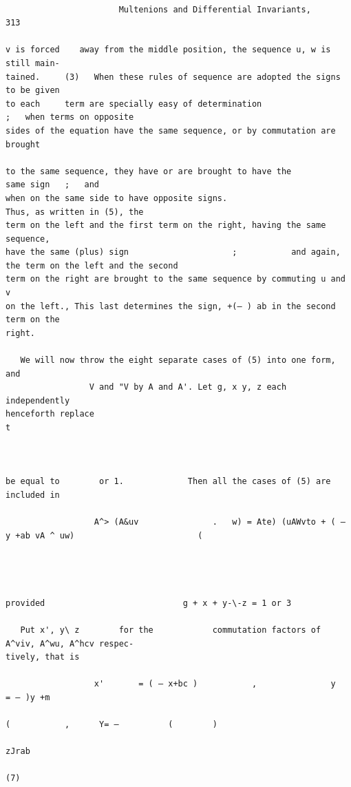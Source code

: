 \documentclass[10pt]{article}
\begin{document}
\begin{verbatim}

                       Multenions and Differential Invariants,                                                                           313

v is forced    away from the middle position, the sequence u, w is still main-
tained.     (3)   When these rules of sequence are adopted the signs to be given
to each     term are specially easy of determination                                         ;   when terms on opposite
sides of the equation have the same sequence, or by commutation are brought

to the same sequence, they have or are brought to have the                                                               same sign   ;   and
when on the same side to have opposite signs.                                              Thus, as written in (5), the
term on the left and the first term on the right, having the same sequence,
have the same (plus) sign                     ;           and again, the term on the left and the second
term on the right are brought to the same sequence by commuting u and v
on the left., This last determines the sign, +(— ) ab in the second term on the
right.

   We will now throw the eight separate cases of (5) into one form, and
                 V and "V by A and A'. Let g, x y, z each independently
henceforth replace                                                                               t



be equal to        or 1.             Then all the cases of (5) are included in

                  A^> (A&uv               .   w) = Ate) (uAWvto + ( — y +ab vA ^ uw)                         (




provided                            g + x + y-\-z = 1 or 3

   Put x', y\ z        for the            commutation factors of A^viv, A^wu, A^hcv respec-
tively, that is

                  x'       = ( — x+bc )           ,               y   = — )y +m
                                                                        (           ,      Y= —          (        )
                                                                                                                      zJrab
                                                                                                                                          (7)



\end{verbatim}
\end{document}
